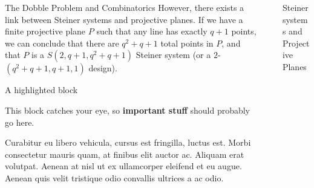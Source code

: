 \documentclass[final]{beamer}
\newlength{\sepwidth}
\newlength{\colwidth}
\newcommand{\separatorcolumn}{\begin{column}{\sepwidth}\end{column}}
\begin{document}
\begin{frame}[t]
\begin{columns}[t]
\begin{column}{\colwidth}
\begin{block}{The Dobble Problem and Combinatorics}
However, there exists a link between Steiner systems and projective planes. If we have a finite projective plane $P$ such that any line has exactly $q+1$ points, we can conclude that there are $q^2+q+1$ total points in $P$, and that $P$ is a $S(2, q+ 1, q^2 +q+ 1)$
Steiner system (or a $2$-$(q^2 +q+ 1, q + 1, 1)$ design)\cite{storme2006}.
  \end{block}

  \begin{alertblock}{A highlighted block}

    This block catches your eye, so \textbf{important stuff} should probably go
    here.

    Curabitur eu libero vehicula, cursus est fringilla, luctus est. Morbi
    consectetur mauris quam, at finibus elit auctor ac. Aliquam erat volutpat.
    Aenean at nisl ut ex ullamcorper eleifend et eu augue. Aenean quis velit
    tristique odio convallis ultrices a ac odio.

  \end{alertblock}

\end{column}

\separatorcolumn

\begin{column}{\colwidth}

  \begin{block}{Steiner systems and Projective Planes}


\end{block}
\end{column}
\end{columns}
\end{frame}
\end{document}
